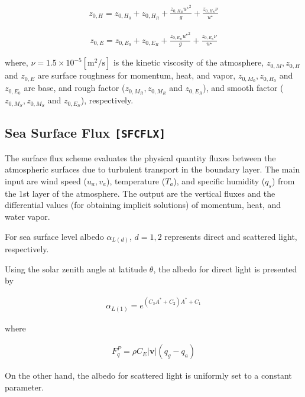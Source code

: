\begin{itemize}
\begin{eqnarray}
    z_{0,H} = z_{0,H_0} + z_{0,H_R} + \frac{z_{0,H_R} {u^\star }^2 }{g} + \frac{z_{0,H_S}\nu }{u^\star}
\end{eqnarray}

\begin{eqnarray}
    z_{0,E} = z_{0,E_0} + z_{0,E_R} + \frac{z_{0,E_R} {u^\star }^2 }{g} + \frac{z_{0,E_S}\nu }{u^\star}
\end{eqnarray}

where, \(\nu = 1.5 \times 10^{-5} \mathrm{[m^2/s]}\) is the kinetic
viscosity of the atmosphere, \(z_{0,M},z_{0,H}\) and \(z_{0,E}\) are
surface roughness for momentum, heat, and vapor, \(z_{0,M_0},z_{0,H_0}\)
and \(z_{0,E_0}\) are base, and rough factor (\(z_{0,M_R},z_{0,M_R}\)
and \(z_{0,E_R}\)), and smooth factor (\(z_{0,M_S},z_{0,M_S}\) and
\(z_{0,E_S}\)), respectively.

\hypertarget{sea-surface-flux-sfcflx}{%
\subsection{\texorpdfstring{Sea Surface Flux
\texttt{{[}SFCFLX{]}}}{Sea Surface Flux {[}SFCFLX{]}}}\label{sea-surface-flux-sfcflx}}

The surface flux scheme evaluates the physical quantity fluxes between
the atmospheric surfaces due to turbulent transport in the boundary
layer. The main input are wind speed (\(u_a, v_a\)), temperature
(\(T_a\)), and specific humidity (\(q_s\)) from the 1st layer of the
atmosphere. The output are the vertical fluxes and the differential
values (for obtaining implicit solutions) of momentum, heat, and water
vapor.

For sea surface level albedo \(\alpha_{L(d)}\), \(d=1,2\) represents
direct and scattered light, respectively.

Using the solar zenith angle at latitude \(\theta\), the albedo for
direct light is presented by

\begin{eqnarray}
    \alpha_{L(1)} = e^{(C_3A^* + C_2) A^* +C_1}
\end{eqnarray}

where

\begin{eqnarray}
    F_q^P =  \rho C_E |{\mathbf{v}}| ( q_g - q_a )
\end{eqnarray}

On the other hand, the albedo for scattered light is uniformly set to a
constant parameter.


\end{itemize}
